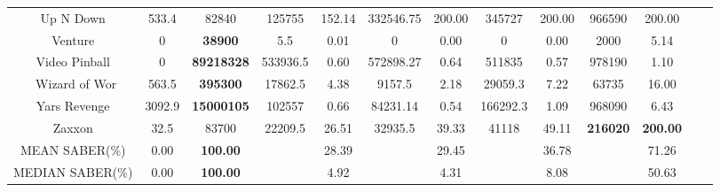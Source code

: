 \documentclass[nohyperref]{article}
\def\GDIHmeanSABER{71.26}
\def\GDIHmedianSABER{50.63}
\def\rainbowmeanSABER{28.39}
\def\rainbowmedianSABER{4.92}
\def\impalameanSABER{29.45}
\def\impalamedianSABER{4.31}
\def\lasermeanSABER{36.78}
\def\lasermedianSABER{8.08}
\theoremstyle{plain}
\begin{document}
\begin{table}[!hb]
\begin{center}
\begin{tabular}{ |c |c |c| c c| c c|  c c |c c |c c |}
 Up N Down          & 533.4     & 82840              & 125755   &152.14  & 332546.75  & 200.00     & 345727  & 200.00     &966590        &200.00\\
 Venture            & 0         & \textbf{38900}     & 5.5      &0.01    & 0          & 0.00       & 0       & 0.00                       &2000            &5.14\\
 Video Pinball      & 0         & \textbf{89218328}  & 533936.5 &0.60    & 572898.27  & 0.64       & 511835  & 0.57                      &978190          &1.10\\\
 Wizard of Wor      & 563.5     & \textbf{395300}    & 17862.5  &4.38    & 9157.5     & 2.18       & 29059.3 & 7.22                          &63735           &16.00\\
 Yars Revenge       & 3092.9    & \textbf{15000105}  & 102557   &0.66    & 84231.14   & 0.54       & 166292.3& 1.09                          &968090          &6.43\\
 Zaxxon             & 32.5      & 83700              & 22209.5  &26.51   & 32935.5    & 39.33      & 41118   & 49.11       &\textbf{216020}          &\textbf{200.00}\\
\hline
MEAN SABER(\%) &     0.00 & \textbf{100.00}   &         & \rainbowmeanSABER &         & \impalameanSABER  &        & \lasermeanSABER &            &\GDIHmeanSABER\\
\hline
MEDIAN SABER(\%) & 0.00   & \textbf{100.00}   &         &\rainbowmedianSABER &         & \impalamedianSABER  &        & \lasermedianSABER  &           & \GDIHmedianSABER  \\
\hline
\end{tabular}
\end{center}
\end{table}
\clearpage
\end{document}
